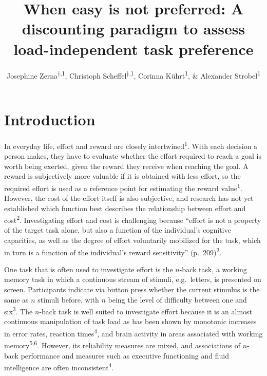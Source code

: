 \documentclass[
  man,floatsintext]{apa6}
\title{When easy is not preferred: A discounting paradigm to assess load-independent task preference}
\author{Josephine Zerna\textsuperscript{$\dagger{}$,1}, Christoph Scheffel\textsuperscript{$\dagger{}$,1}, Corinna Kührt\textsuperscript{1}, \& Alexander Strobel\textsuperscript{1}}
\date{}
\affiliation{\vspace{0.5cm}\textsuperscript{1} Faculty of Psychology, Technische Universität Dresden, 01062 Dresden, Germany}
\begin{document}
\maketitle

\renewcommand\thesection{\Alph{section}}
\setcounter{figure}{0}

\hypertarget{introduction}{%
\section{Introduction}\label{introduction}}

In everyday life, effort and reward are closely intertwined\textsuperscript{1}.
With each decision a person makes, they have to evaluate whether the effort required to reach a goal is worth being exerted, given the reward they receive when reaching the goal.
A reward is subjectively more valuable if it is obtained with less effort, so the required effort is used as a reference point for estimating the reward value\textsuperscript{1}.
However, the cost of the effort itself is also subjective, and research has not yet established which function best describes the relationship between effort and cost\textsuperscript{2}.
Investigating effort and cost is challenging because ``effort is not a property of the target task alone, but also a function of the individual's cognitive capacities, as well as the degree of effort voluntarily mobilized for the task, which in turn is a function of the individual's reward sensitivity'' (p.~209)\textsuperscript{2}.

One task that is often used to investigate effort is the \(n\)-back task, a working memory task in which a continuous stream of stimuli, e.g.~letters, is presented on screen.
Participants indicate via button press whether the current stimulus is the same as \(n\) stimuli before, with \(n\) being the level of difficulty between one and six\textsuperscript{3}.
The \(n\)-back task is well suited to investigate effort because it is an almost continuous manipulation of task load as has been shown by monotonic increases in error rates, reaction times\textsuperscript{4}, and brain activity in areas associated with working memory\textsuperscript{5,6}.
However, its reliability measures are mixed, and associations of \(n\)-back performance and measures such as executive functioning and fluid intelligence are often inconsistent\textsuperscript{4}.
\end{document}
